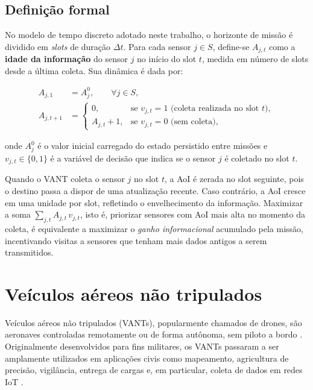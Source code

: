 \subsection{Definição formal}

No modelo de tempo discreto adotado neste trabalho, o horizonte de missão é dividido em \emph{slots} de duração $\Delta t$. Para cada sensor $j \in S$, define-se $A_{j,t}$ como a \textbf{idade da informação} do sensor $j$ no início do slot $t$, medida em número de slots desde a última coleta. Sua dinâmica é dada por:

\begin{align}
    A_{j,1} &= A_j^0, \qquad \forall j \in S, \tag{AoI-0} \\[4pt]
    A_{j,t+1} &=
    \begin{cases}
        0, & \text{se } v_{j,t} = 1 \text{ (coleta realizada no slot } t\text{)}, \\[4pt]
        A_{j,t} + 1, & \text{se } v_{j,t} = 0 \text{ (sem coleta)},
    \end{cases}
    \tag{AoI-1}
\end{align}

onde $A_j^0$ é o valor inicial carregado do estado persistido entre missões e $v_{j,t} \in \{0,1\}$ é a variável de decisão que indica se o sensor $j$ é coletado no slot $t$.

Quando o VANT coleta o sensor $j$ no slot $t$, a AoI é zerada no slot seguinte, pois o destino passa a dispor de uma atualização recente. Caso contrário, a AoI cresce em uma unidade por slot, refletindo o envelhecimento da informação. Maximizar a soma $\sum_{j,t} A_{j,t}\, v_{j,t}$, isto é, priorizar sensores com AoI mais alta no momento da coleta, é equivalente a maximizar o \emph{ganho informacional} acumulado pela missão, incentivando visitas a sensores que tenham mais dados antigos a serem transmitidos.

\section{Veículos aéreos não tripulados}
\label{sec:vants}

Veículos aéreos não tripulados (VANTs), popularmente chamados de drones, são aeronaves controladas remotamente ou de forma autônoma, sem piloto a bordo \cite{messaoudi2023survey}. Originalmente desenvolvidos para fins militares, os VANTs passaram a ser amplamente utilizados em aplicações civis como mapeamento, agricultura de precisão, vigilância, entrega de cargas e, em particular, coleta de dados em redes IoT \cite{wei2022survey}.

